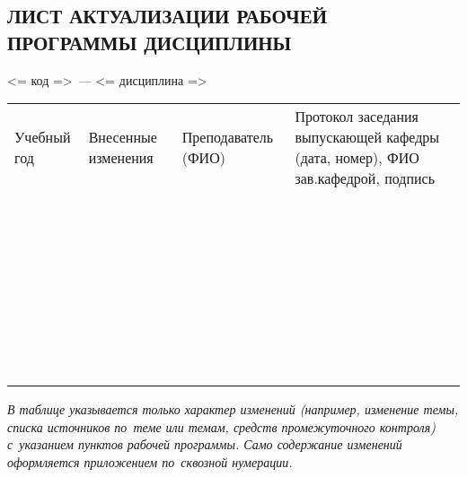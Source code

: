 \documentclass[a4paper,12pt]{article}
\begin{document}
\newpage
\begin{center}
\section*{ЛИСТ АКТУАЛИЗАЦИИ РАБОЧЕЙ ПРОГРАММЫ ДИСЦИПЛИНЫ}
<= код =>\ --- <= дисциплина => 
\end{center}

  \noindent
  \begin{tabular}{|p{15mm}|p{67mm}|p{25mm}|p{41mm}|}
    \hline
    \small\centering
    Учебный год 
    & \small\centering
    Внесенные изменения 
    & \small\centering
    Преподаватель (ФИО) 
    & \small\centering\arraybackslash
    Протокол заседания выпускающей кафедры (дата, номер), ФИО зав.кафедрой, подпись \\
    & & & \\\hline
    & & & \\\hline
    & & & \\\hline
    & & & \\\hline
    & & & \\\hline
    & & & \\\hline
    & & & \\\hline
    & & & \\\hline
    & & & \\\hline
    & & & \\\hline
    & & & \\\hline
    & & & \\\hline
    & & & \\\hline
    & & & \\\hline
    & & & \\\hline
    & & & \\\hline
    & & & \\\hline
    & & & \\\hline
    & & & \\\hline
    & & & \\\hline
    & & & \\\hline
    & & & \\\hline
    & & & \\\hline
    & & & \\\hline
    & & & \\\hline
    & & & \\\hline
    & & & \\\hline
    & & & \\\hline
    & & & \\\hline
    & & & \\\hline
    & & & \\\hline
    & & & \\\hline
    & & & \\\hline
    & & & \\\hline
    & & & \\\hline
    & & & \\\hline
  \end{tabular}

  \medskip\noindent\textit{В таблице указывается только характер изменений (например, изменение темы, списка источников по~теме или темам, средств промежуточного контроля) с~указанием пунктов рабочей программы. Само содержание изменений оформляется приложением по~сквозной нумерации.}

\newpage\tableofcontents
\end{document}
